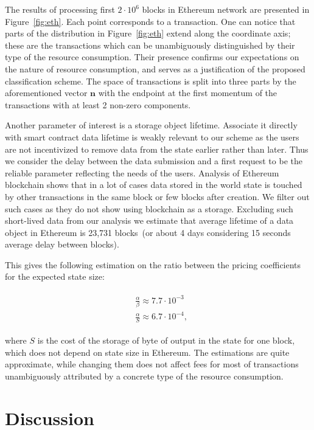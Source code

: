 \documentclass[]{llncs}   %
\begin{document}
The results of processing first $2\cdot10^6$ blocks in Ethereum network are presented in Figure~\ref{fig:eth}.
Each point corresponds to a transaction.
One can notice that parts of the distribution in Figure~\ref{fig:eth} extend
along the coordinate axis; these are the transactions which can be
unambiguously distinguished by their type of the resource consumption. Their
presence confirms our expectations on the nature of resource consumption, and
serves as a justification of the proposed classification scheme. The space of
transactions is split into three parts by the aforementioned vector $\mathbf{n}$
with the endpoint at the first momentum of the transactions with at least 2
non-zero components. %

Another parameter of interest is a storage object lifetime. Associate it directly
with smart contract data lifetime is weakly relevant to our scheme as the users are not incentivized to remove data from the state earlier rather than later. Thus we consider the delay between the data submission and a first request to be the reliable parameter reflecting the needs of the users.
Analysis of Ethereum blockchain shows that in a lot of cases data stored in the world state
is touched by other transactions in the same block or few blocks after creation.
We filter out such cases as they do not show using blockchain as a storage. Excluding such short-lived data from our analysis
we estimate that average lifetime of a data object in Ethereum is 23,731 blocks~(or about 4 days
considering 15 seconds average delay between blocks).

This gives the following estimation on the ratio between the pricing coefficients for the expected state size:

\begin{align}
\begin{split}
&\frac{\alpha}{\beta} \approx 7.7\cdot10^{-3} \\
&\frac{\alpha}{S} \approx 6.7\cdot10^{-4},
\end{split}
\end{align}

where $S$ is the cost of the storage of byte of output in the state for one block, which does
not depend on state size in Ethereum. The estimations are quite approximate, while changing
them does not affect fees for most of transactions unambiguously attributed by a concrete type of the resource consumption.

\section{Discussion}
\label{sec:conslusion}
\end{document}
